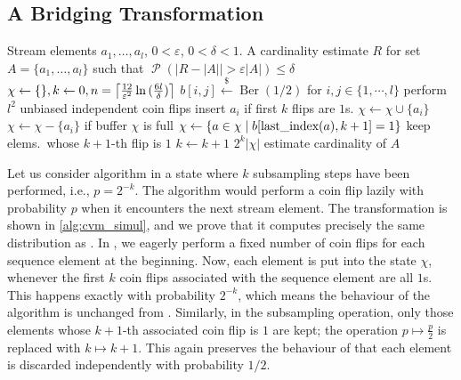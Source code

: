 \documentclass[a4paper,UKenglish,cleveref, autoref, thm-restate]{lipics-v2021}
\newcommand{\getsr}{\xleftarrow{\$}}
\DeclarePairedDelimiter{\ceil}{\lceil}{\rceil}
\DeclareMathOperator{\Ber}{\mathrm{Ber}}
\DeclareMathOperator{\prob}{\mathcal P}
\newcommand*\circled[1]{\tikz[baseline=(char.base)]{
            \node[shape=circle,draw, minimum size=3.5mm,inner sep=0.5pt] (char) {#1};}}
\begin{document}
\subsection{A Bridging Transformation}
\begin{algorithm}[t]
	\caption{Modified CVM algorithm with independent coin flips. The function last{\textunderscore}index returns the index of the last occurrence of an element in the sequence, before the current iteration.}\label{alg:cvm_simul}
	\begin{algorithmic}[1]
  \Require Stream elements $a_1,\dots,a_l$, $0 < \varepsilon$, $0 < \delta < 1$.
  \Ensure A cardinality estimate $R$ for set $A = \{ a_1,\dots,a_l \}$ such that $\prob \left( |R - |A| | > \varepsilon |A| \right) \leq \delta$
  \State $\chi \gets \{\}, k \gets 0, n = \ceil*{\frac{12}{\varepsilon^2} \ln{(\frac{6l}{\delta})} }$
  \State $b[i,j] \getsr \Ber(1/2)$ for $i,j \in \{1,\cdots,l\}$ \Comment perform $l^2$ unbiased independent coin flips
     \Comment insert $a_i$ if first $k$ flips are $1$s.
      \State $\chi \gets \chi \cup \{a_i\}$
    \Else
      \State $\chi \gets \chi - \{a_i\}$
    \EndIf
     \Comment if buffer $\chi$ is full
      \State $\chi \gets \{a \in \chi \;|\; b[\textrm{last{\textunderscore}index}(a),k+1] = 1\}$ \Comment keep elems.~whose $k+1$-th flip is $1$
      \State $k \gets k+1$
    \EndIf
  \EndFor
  \State \Return $2^k |\chi|$ \Comment estimate cardinality of $A$
  \end{algorithmic}
\end{algorithm}

Let us consider algorithm \circled{B} in a state where $k$ subsampling steps have been performed, i.e., $p = 2^{-k}$.
The algorithm would perform a coin flip lazily with probability $p$ when it encounters the next stream element.
The transformation \circled{C} is shown in \cref{alg:cvm_simul}, and we prove that it computes precisely the same distribution as \circled{B}.
In \circled{C}, we eagerly perform a fixed number of coin flips for each sequence element at the beginning.
Now, each element is put into the state $\chi$, whenever the first $k$ coin flips associated with the sequence element are all $1$s.
This happens exactly with probability $2^{-k}$, which means the behaviour of the algorithm is unchanged from \circled{B}.
Similarly, in the subsampling operation, only those elements whose $k+1$-th associated coin flip is $1$ are kept; the operation $p \mapsto \frac{p}{2}$ is replaced with $k \mapsto k+1$.
This again preserves the behaviour of \circled{B} that each element is discarded independently with probability $1/2$.
\end{document}

